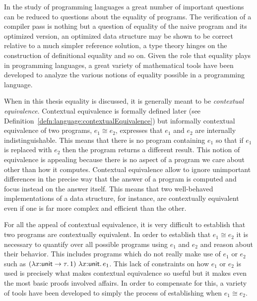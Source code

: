 In the study of programming languages a great number of important
questions can be reduced to questions about the equality of
programs. The verification of a compiler pass is nothing but a
question of equality of the naive program and its optimized version,
an optimized data structure may be shown to be correct relative to a
much simpler reference solution,
a type theory hinges on the
construction of definitional equality and so on. Given the role that
equality plays in programming languages, a great variety of
mathematical tools have been developed to analyze the various notions
of equality possible in a programming language.

When in this thesis equality is discussed, it is generally meant to be
\emph{contextual equivalence}. Contextual equivalence is formally
defined later (see
Definition~\ref{defn:language:contextualEquivalence}) but informally
contextual equivalence of two programs, $e_1 \cong e_2$, expresses
that $e_1$ and $e_2$ are internally indistinguishable. This means that
there is no program containing $e_1$ so that if $e_1$ is replaced with
$e_2$ then the program returns a different result. This notion of
equivalence is appealing because there is no aspect of a program we
care about other than how it computes.
Contextual equivalence allow to
ignore unimportant differences in the precise way that the answer of a
program is computed and focus instead on the answer itself. This means
that two well-behaved implementations of a data structure, for
instance, are contextually equivalent even if one is far more complex
and efficient than the other.


For all the appeal of contextual equivalence, it is very difficult to
establish that two programs are contextually equivalent. In order to
establish that $e_1 \cong e_2$ it is necessary to quantify over all possible
programs using $e_1$ and $e_2$ and reason about their behavior. This
includes programs which do not really make use of $e_1$ or $e_2$ such
as $(\lambda x {:} \mathsf{unit} \to \tau.\, 1)\ \lambda x {:} \mathsf{unit}.\, e_1$. This
lack of constraints on how $e_1$ or $e_2$ is used is precisely what
makes contextual equivalence so useful but it makes even the most
basic proofs involved affairs.
In order to compensate for this, a
variety of tools have been developed to simply the process of
establishing when $e_1 \cong e_2$.

